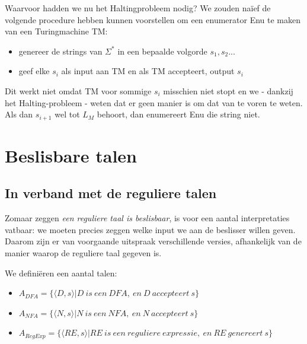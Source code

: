 Waarvoor hadden we nu het Haltingprobleem nodig? We zouden na\"{i}ef de
volgende procedure hebben kunnen voorstellen om een enumerator Enu te
maken van een Turingmachine TM:

\begin{itemize}
\item[]
genereer de strings van $\Sigma^*$ in een bepaalde volgorde
$s_1, s_2...$

\item[]
geef elke $s_i$ als input aan TM en als TM accepteert, output $s_i$
\end{itemize}



Dit werkt niet omdat TM voor sommige $s_i$ misschien niet stopt en we -
dankzij het Halting-probleem - weten dat er geen manier is om dat van
te voren te weten. Als dan $s_{i+1}$ wel tot $L_M$ behoort, dan
enumereert Enu die string niet.



\section{Beslisbare talen}

\subsection{In verband met de reguliere talen}

Zomaar zeggen {\em een reguliere taal is beslisbaar}, is voor een aantal interpretaties vatbaar: we moeten precies zeggen welke input we aan de beslisser
willen geven. Daarom zijn er van voorgaande uitspraak verschillende
versies, afhankelijk van de manier waarop de reguliere taal gegeven is.


We defini\"eren een aantal talen:
\begin{itemize}
\item
$A_{DFA} = \{\langle D,s \rangle|D~is~een~DFA,~en~D~accepteert~s\}$
\item 
$A_{NFA} = \{\langle N,s \rangle|N~is~een~NFA,~en~N~accepteert~s\}$
\item 
$A_{RegExp} = \{\langle RE,s \rangle|RE~is~een~reguliere~expressie,~en~RE~genereert~s\}$
\end{itemize}


